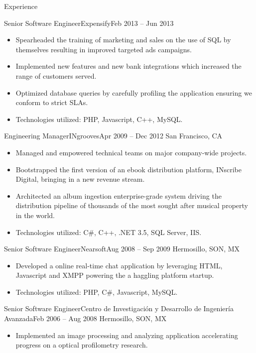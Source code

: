 \documentclass[calibri]{mcdowellcv}
\begin{document}
\begin{cvsection}{Experience}
\begin{cvsubsection}{Senior Software Engineer}{Expensify}{Feb 2013 -- Jun 2013}
\begin{itemize}
			\item Spearheaded the training of marketing and sales on the use of SQL by themselves resulting in improved targeted ads campaigns.
			\item Implemented new features and new bank integrations which increased the range of customers served.
			\item Optimized database queries by carefully profiling the application ensuring we conform to strict SLAs.
			\item Technologies utilized: PHP, Javascript, C++, MySQL.
		\end{itemize}
	\end{cvsubsection}
	\vskip 0.3in
	\begin{cvsubsection}{Engineering Manager}{INgrooves}{Apr 2009 -- Dec 2012}
		San Francisco, CA
		\begin{itemize}%
			\item Managed and empowered technical teams on major company-wide projects.
			\item Bootstrapped the first version of an ebook distribution platform, INscribe Digital, bringing in a new revenue stream.
			\item Architected an album ingestion enterprise-grade system driving the distribution pipeline of thousands of the most sought after musical property in the world.
			\item Technologies utilized: C\#, C++, .NET 3.5, SQL Server, IIS.
		\end{itemize}
	\end{cvsubsection}
	\vskip 0.3in
	\begin{cvsubsection}{Senior Software Engineer}{Nearsoft}{Aug 2008 -- Sep 2009}
		Hermosillo, SON, MX
		\begin{itemize}%
			\item Developed a online real-time chat application by leveraging HTML, Javascript and XMPP powering the a haggling platform startup.
			\item Technologies utilized: PHP, C\#, Javascript, MySQL.
		\end{itemize}
	\end{cvsubsection}
	\vskip 0.3in
	\begin{cvsubsection}{Senior Software Engineer}{Centro de Investigación y Desarrollo de Ingeniería Avanzada}{Feb 2006 -- Aug 2008}
		Hermosillo, SON, MX
		\begin{itemize}%
			\item Implemented an image processing and analyzing application accelerating progress on a optical profilometry research.

\end{itemize}
\end{cvsubsection}
\end{cvsection}
\end{document}

